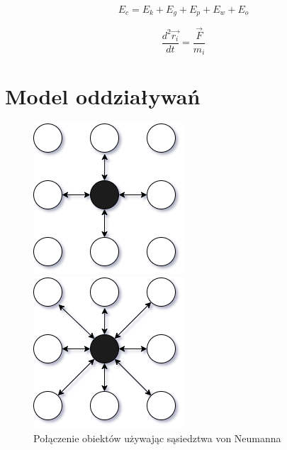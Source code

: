 \documentclass[12pt, letterpaper]{report}
\begin{document}
    \begin{equation}
        E_{c} = E_{k} + E_{g} + E_{p} + E_{w} + E_{o}
    \end{equation}

    \begin{equation}
        \frac{d^{2} \vec{r_i}}{dt} = \frac{\vec{F}}{m_i}
    \end{equation}


    \clearpage
    \section{Model oddziaływań}

    \begin{figure}
        \includegraphics[width=0.95\linewidth]{four_nebiours.drawio.png} 
        \caption{Połączenie obiektów używając sąsiedztwa von Neumanna}
        \includegraphics[width=0.95\linewidth]{eight_nebiours.drawio.png} 

\end{figure}
\end{document}
